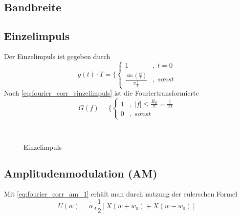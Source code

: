 \subsection{Bandbreite}

\subsection{Einzelimpuls}
Der Einzelimpuls ist gegeben durch
\begin{equation}
	g(t) \cdot T = \lbrace 
		\begin{cases}
		1 & ,\;t = 0\\
		\frac{\sin \left(\frac{\pi t}{T}\right)}{\pi \frac{t}{T}} & ,\;sonst
	\end{cases} \nonumber
\end{equation}
Nach \eqref{eq:fourier_corr_einzelimpuls} ist die Fouriertransformierte
\begin{equation}
	G(f) = \lbrace 
	\begin{cases}
		1 & ,\; |f| \leq \frac{R_S}{2} = \frac{1}{2T}\\
		0 & ,\; sonst
	\end{cases} \nonumber
\end{equation}

\begin{figure}[H]
	\centering
	 ~
	\caption{Einzelimpuls \protect\cite{NT2}}
\end{figure}

\subsection{Amplitudenmodulation (AM)}
Mit \eqref{eq:fourier_corr_am_1} erhält man durch nutzung der eulerschen Formel
\begin{equation}
	U(w) = \alpha_A \frac{1}{2}\left[X(w+w_0) + X(w-w_0)\right]
\end{equation}

